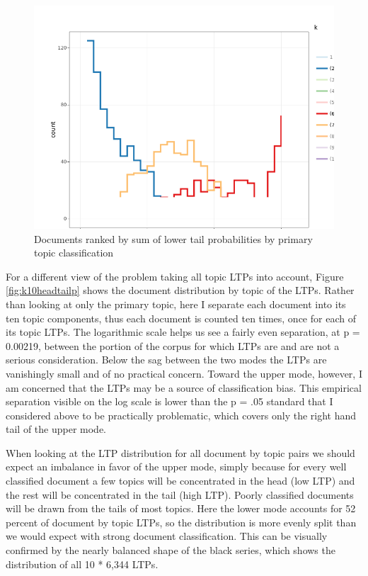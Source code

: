 \documentclass[]{book}
\theoremstyle{definition}
\theoremstyle{definition}
\theoremstyle{definition}
\theoremstyle{remark}
\begin{document}
\begin{figure}

{\centering \includegraphics[width=0.9\linewidth]{03_files/figure-latex/worstall-1} 

}

\caption{Documents ranked by sum of lower tail probabilities by primary topic classification}\label{fig:worstall}
\end{figure}

For a different view of the problem taking all topic LTPs into account,
Figure \ref{fig:k10headtailp} shows the document distribution by topic
of the LTPs. Rather than looking at only the primary topic, here I
separate each document into its ten topic components, thus each document
is counted ten times, once for each of its topic LTPs. The logarithmic
scale helps us see a fairly even separation, at p = 0.00219, between the
portion of the corpus for which LTPs are and are not a serious
consideration. Below the sag between the two modes the LTPs are
vanishingly small and of no practical concern. Toward the upper mode,
however, I am concerned that the LTPs may be a source of classification
bias. This empirical separation visible on the log scale is lower than
the p = .05 standard that I considered above to be practically
problematic, which covers only the right hand tail of the upper mode.

When looking at the LTP distribution for all document by topic pairs we
should expect an imbalance in favor of the upper mode, simply because
for every well classified document a few topics will be concentrated in
the head (low LTP) and the rest will be concentrated in the tail (high
LTP). Poorly classified documents will be drawn from the tails of most
topics. Here the lower mode accounts for 52 percent of document by topic
LTPs, so the distribution is more evenly split than we would expect with
strong document classification. This can be visually confirmed by the
nearly balanced shape of the black series, which shows the distribution
of all 10 * 6,344 LTPs.
\end{document}
